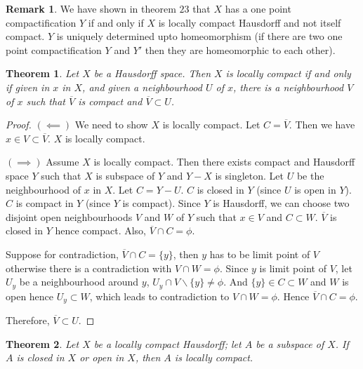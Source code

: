 \documentclass[12pt,reqno]{amsart}
\theoremstyle{plain}
\newtheorem{thm}{Theorem}
\theoremstyle{definition}
\newtheorem{rem}{Remark}
\begin{document}
\begin{rem}
    We have shown in theorem $23$ that $X$ has a one point compactification $Y$ if and only if $X$ is locally compact Hausdorff and not itself compact. $Y$ is uniquely determined upto homeomorphism (if there are two one point compactification $Y$ and $Y'$ then they are homeomorphic to each other). 
\end{rem}
\begin{thm}
    Let $X$ be a Hausdorff space. Then $X$ is locally compact if and only if given in $x$ in $X$, and given a neighbourhood $U$ of $x$, there is a neighbourhood $V$ of $x$ such that $\overline{V}$ is compact and $\overline{V} \subset U$.
\end{thm}
\begin{proof}
    $(\impliedby)$ We need to show $X$ is locally compact. Let $C = \overline{V}$. Then we have $x \in V \subset \overline{V}$. $X$ is locally compact.
    
    \noindent $(\implies)$ Assume $X$ is locally compact. Then there exists compact and Hausdorff space $Y$ such that $X$ is subspace of $Y$ and $Y - X$ is singleton. Let $U$ be the neighbourhood of $x$ in $X$. Let $C = Y - U$. $C$ is closed in $Y$ (since $U$ is open in $Y$). $C$ is compact in $Y$ (since $Y$ is compact). Since $Y$ is Hausdorff, we can choose two disjoint open neighbourhoods $V$ and $W$ of $Y$ such that $x \in V$ and $C \subset W$. $\overline{V}$ is closed in $Y$ hence compact. Also, $\overline{V} \cap C = \phi$.
    
    Suppose for contradiction, $\overline{V} \cap C = \{y\}$, then $y$ has to be limit point of $V$ otherwise there is a contradiction with $V \cap W = \phi$. Since $y$ is limit point of $V$, let $U_y$ be a neighbourhood around $y$, $U_y \cap V\backslash\{y\} \neq \phi$. And $\{y\} \in C \subset W$ and $W$ is open hence $U_y \subset W$, which leads to contradiction to $V \cap W = \phi$. Hence $\overline{V} \cap C = \phi$.

    \noindent Therefore, $\overline{V} \subset U$.
\end{proof}
\begin{thm}
    Let $X$ be a locally compact Hausdorff; let $A$ be a subspace of $X$. If $A$ is closed in $X$ or open in $X$, then $A$ is locally compact.
\end{thm}
\end{document}
